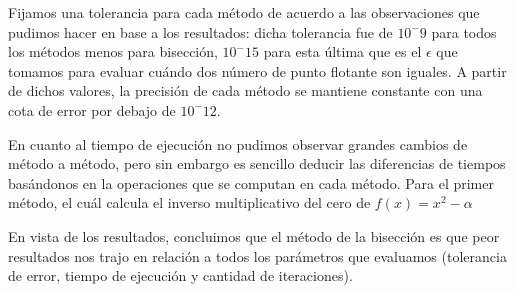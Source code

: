 Fijamos una tolerancia para cada método de acuerdo a las observaciones que pudimos hacer en base a los resultados: dicha tolerancia fue de ${10^-9}$ para
todos los métodos menos para bisección, ${10^-15}$ para esta última que es el $\epsilon$ que tomamos para evaluar cuándo dos número de punto flotante son iguales. A partir de dichos valores, la precisión de cada método se mantiene constante con una cota de error por debajo de ${10^-12}$.

En cuanto al tiempo de ejecución no pudimos observar grandes cambios de método a método, pero sin embargo es sencillo deducir las diferencias de tiempos basándonos en la operaciones que se computan en cada método. Para el primer método, el cuál calcula el inverso multiplicativo del cero de $f(x) = x^2 - \alpha$




En vista de los resultados, concluimos que el método de la bisección es que peor resultados nos trajo en relación a todos los parámetros que evaluamos (tolerancia de error, tiempo de ejecución y cantidad de iteraciones).